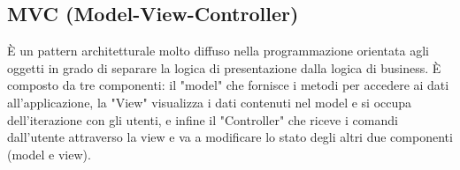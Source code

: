 \subsection{MVC (Model-View-Controller)}
È un pattern architetturale molto diffuso nella programmazione orientata agli oggetti in grado di separare la logica di presentazione dalla logica di business. È composto da tre componenti: il "model" che fornisce i metodi per accedere ai dati all'applicazione, la "View" visualizza i dati contenuti nel model e si occupa dell'iterazione con gli utenti, e infine il "Controller" che riceve i comandi dall'utente attraverso la view e va a modificare lo stato degli altri due componenti (model e view).
